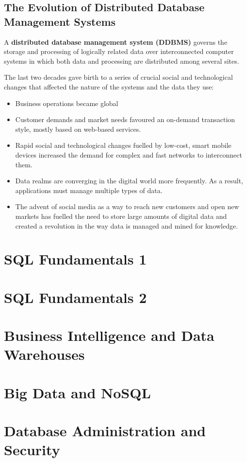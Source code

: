 \documentclass[a4paper, 11pt, titlepage]{report}
\begin{document}
\section{The Evolution of Distributed Database Management Systems}
A \textbf{distributed database management system (DDBMS)} governs the storage and processing of logically related data over interconnected computer systems in which both data and processing are distributed among several sites.

The last two decades gave birth to a series of crucial social and technological changes that affected the nature of the systems and the data they use:
\begin{itemize}
\item Business operations became global
\item Customer demands and market needs favoured an on-demand transaction style,
mostly based on web-based services.
\item Rapid social and technological changes fuelled by low-cost, smart mobile devices increased the demand for complex and fast networks to interconnect them. 
\item Data realms are converging in the digital world more frequently. As a result, applications must manage multiple types of data.
\item The advent of social media as a way to reach new customers and open new markets has fuelled the need to store large amounts of digital data and created a revolution in the way data is managed and mined for knowledge.
\end{itemize}
\chapter{SQL Fundamentals 1}
\chapter{SQL Fundamentals 2}
\chapter{Business Intelligence and Data Warehouses}
\chapter{Big Data and NoSQL}
\chapter{Database Administration and Security}
\end{document}
